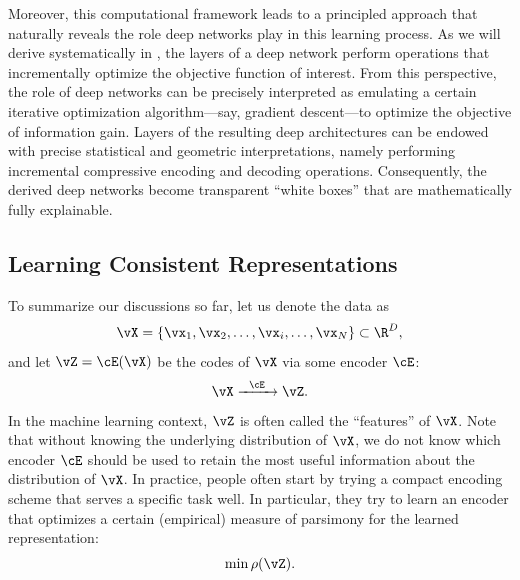\documentclass[../../book-main.tex]{subfiles}
\begin{document}
Moreover, this computational framework leads to a principled approach
that naturally reveals the role deep networks play in this learning
process. As we will derive systematically in
, the layers of a deep network perform
operations that incrementally optimize the objective function of
interest. From this perspective, the role of deep networks can be
precisely interpreted as emulating a certain iterative optimization
algorithm---say, gradient descent---to optimize the objective of
information gain. Layers of the resulting deep architectures can be
endowed with precise statistical and geometric interpretations,
namely performing incremental compressive encoding and decoding
operations. Consequently, the derived deep networks become
transparent ``white boxes'' that are mathematically fully explainable.

\subsection{Learning Consistent Representations}

\label{sec:consistency}

To summarize our discussions so far, let us denote the data as
\begin{equation}
    \vX = \{\vx_{1}, \vx_{2}, \ldots, \vx_{i}, \ldots, \vx_{N}\} \subset \R^{D},
\end{equation}
and let \(\vZ = \cE(\vX)\) be the codes of \(\vX\) via some encoder \(\cE\):
\begin{equation}
    \vX  \xrightarrow{\hspace{2mm} \cE\hspace{2mm}} \vZ.
    \label{eqn:open-loop}
\end{equation}
In the machine learning context, \(\vZ\) is often called the
``features'' of \(\vX\). Note that without knowing the underlying
distribution of \(\vX\), we do not know which encoder \(\cE\) should
be used to retain the most useful information about the distribution
of \(\vX\). In practice, people often start by trying a compact
encoding scheme that serves a specific task well. In particular, they
try to learn an encoder that optimizes a certain (empirical) measure
of parsimony for the learned representation:
\begin{equation}
    \min \rho(\vZ).
\end{equation}
\end{document}
